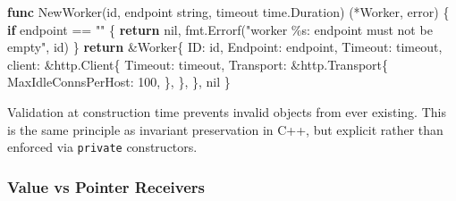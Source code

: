 \documentclass[
]{article}
\newenvironment{Shaded}{}{}
\newcommand{\ControlFlowTok}[1]{\textcolor[rgb]{0.00,0.44,0.13}{\textbf{#1}}}
\newcommand{\DataTypeTok}[1]{\textcolor[rgb]{0.56,0.13,0.00}{#1}}
\newcommand{\DecValTok}[1]{\textcolor[rgb]{0.25,0.63,0.44}{#1}}
\newcommand{\KeywordTok}[1]{\textcolor[rgb]{0.00,0.44,0.13}{\textbf{#1}}}
\newcommand{\NormalTok}[1]{#1}
\newcommand{\OperatorTok}[1]{\textcolor[rgb]{0.40,0.40,0.40}{#1}}
\newcommand{\OtherTok}[1]{\textcolor[rgb]{0.00,0.44,0.13}{#1}}
\newcommand{\StringTok}[1]{\textcolor[rgb]{0.25,0.44,0.63}{#1}}
\begin{document}
\begin{Shaded}
\begin{Highlighting}[]
\KeywordTok{func}\NormalTok{ NewWorker}\OperatorTok{(}\NormalTok{id}\OperatorTok{,}\NormalTok{ endpoint }\DataTypeTok{string}\OperatorTok{,}\NormalTok{ timeout time}\OperatorTok{.}\NormalTok{Duration}\OperatorTok{)} \OperatorTok{(*}\NormalTok{Worker}\OperatorTok{,} \DataTypeTok{error}\OperatorTok{)} \OperatorTok{\{}
    \ControlFlowTok{if}\NormalTok{ endpoint }\OperatorTok{==} \StringTok{""} \OperatorTok{\{}
        \ControlFlowTok{return} \OtherTok{nil}\OperatorTok{,}\NormalTok{ fmt}\OperatorTok{.}\NormalTok{Errorf}\OperatorTok{(}\StringTok{"worker \%s: endpoint must not be empty"}\OperatorTok{,}\NormalTok{ id}\OperatorTok{)}
    \OperatorTok{\}}
    \ControlFlowTok{return} \OperatorTok{\&}\NormalTok{Worker}\OperatorTok{\{}
\NormalTok{        ID}\OperatorTok{:}\NormalTok{       id}\OperatorTok{,}
\NormalTok{        Endpoint}\OperatorTok{:}\NormalTok{ endpoint}\OperatorTok{,}
\NormalTok{        Timeout}\OperatorTok{:}\NormalTok{  timeout}\OperatorTok{,}
\NormalTok{        client}\OperatorTok{:} \OperatorTok{\&}\NormalTok{http}\OperatorTok{.}\NormalTok{Client}\OperatorTok{\{}
\NormalTok{            Timeout}\OperatorTok{:}\NormalTok{ timeout}\OperatorTok{,}
\NormalTok{            Transport}\OperatorTok{:} \OperatorTok{\&}\NormalTok{http}\OperatorTok{.}\NormalTok{Transport}\OperatorTok{\{}
\NormalTok{                MaxIdleConnsPerHost}\OperatorTok{:} \DecValTok{100}\OperatorTok{,}
            \OperatorTok{\},}
        \OperatorTok{\},}
    \OperatorTok{\},} \OtherTok{nil}
\OperatorTok{\}}
\end{Highlighting}
\end{Shaded}

Validation at construction time prevents invalid objects from ever
existing. This is the same principle as invariant preservation in C++,
but explicit rather than enforced via \texttt{private} constructors.

\hypertarget{value-vs-pointer-receivers}{%
\subsubsection{Value vs Pointer
Receivers}\label{value-vs-pointer-receivers}}
\end{document}
